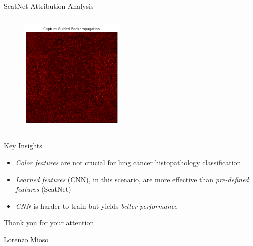 \documentclass[aspectratio=169,8pt]{beamer}  %
\begin{document}
\begin{frame}{ScatNet Attribution Analysis}
\begin{columns}[T]
\begin{column}{0.5\textwidth}
\begin{figure}
\vspace{0.2cm}
\includegraphics[width=0.45\textwidth]{imgs/scatnet_gbp_captum.png}
\end{figure}
\end{column}
\end{columns}
\end{frame}


\begin{frame}{Key Insights}
\begin{itemize}
\item \emph{Color features} are not crucial for lung cancer histopathology classification
\item \emph{Learned features} (CNN), in this scenario, are more effective than \emph{pre-defined features} (ScatNet)
\item \emph{CNN} is harder to train but yields \emph{better performance}
\end{itemize}
\end{frame}

\begin{frame}[plain]
\centering
\vspace{2cm}
{\Large Thank you for your attention}

\vspace{1cm}
{\large Lorenzo Mioso}
\end{frame}
\end{document}
